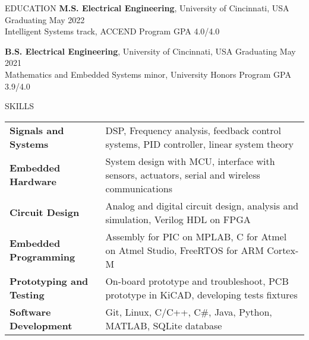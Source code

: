 \documentclass{../lib/resume} %
\begin{document}
	


	
	\begin{rSection}{EDUCATION}
		{\bf M.S. Electrical Engineering}, University of Cincinnati, USA \hfill {Graduating May 2022} \\
		Intelligent Systems track, ACCEND Program \hfill GPA 4.0/4.0 \smallskip
		
		{\bf B.S. Electrical Engineering}, University of Cincinnati, USA \hfill {Graduating May 2021}\\
		Mathematics and Embedded Systems minor, University Honors Program \hfill {GPA 3.9/4.0}
		
		
		
		
	\end{rSection}
	
	\begin{rSection}{SKILLS}
		
		\begin{tabular}{ @{} >{\bfseries}l @{\hspace{2ex}} l }
			Signals and Systems & DSP, Frequency analysis, feedback control systems, PID controller, linear system theory	\\
			Embedded Hardware & System design with MCU, interface with sensors, actuators, serial and wireless communications \\ 
			Circuit Design & Analog and digital circuit design, analysis and simulation, Verilog HDL on FPGA \\
			Embedded Programming & Assembly for PIC on MPLAB, C for Atmel on Atmel Studio, FreeRTOS for ARM Cortex-M \\
			Prototyping and Testing &  On-board prototype and troubleshoot, PCB prototype in KiCAD, developing tests fixtures \\ 
			Software Development & Git, Linux, C/C++, C\#, Java, Python, MATLAB, SQLite database \\
		\end{tabular}
	\end{rSection}
	
\end{document}
